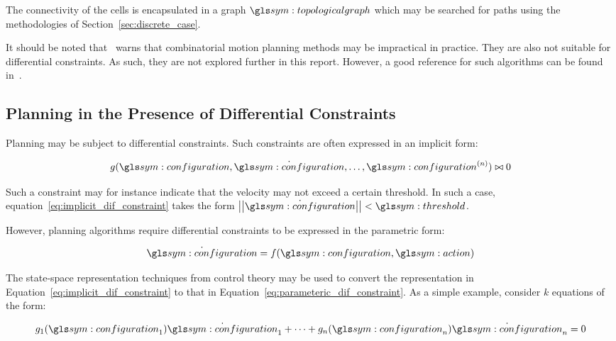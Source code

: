 			The connectivity of the cells is encapsulated in a graph
			$\topologicalgraph$ which may be searched for paths using the
			methodologies of Section~\ref{sec:discrete_case}.

			It should be noted that~\cite{bib:planning:planning_algorithms}
			warns that combinatorial motion planning methods may be impractical
			in practice. They are also not suitable for differential
			constraints.  As such, they are not explored further in this report.
			However, a good reference for such algorithms can be found
			in~\cite{bib:planning:robot_motion_planning}.


	\subsection{Planning in the Presence of Differential Constraints}%
	\label{sec:planning_in_the_presence_of_differential_constraints}

		Planning may be subject to differential constraints. Such constraints
		are often expressed in an implicit form:

		\begin{equation}
			g(\configuration, \dot{\configuration}, \ldots, \tdern{\configuration}{n})
				\relop 0
			\label{eq:implicit_dif_constraint}
		\end{equation}

		Such a constraint may for instance indicate that the velocity may not
		exceed a certain threshold. In such a case,
		equation~\ref{eq:implicit_dif_constraint} takes the form
		$\norm{\dot{\configuration}} < \threshold$.

		However, planning algorithms require differential constraints to be
		expressed in the parametric form:

		\begin{equation}
			\dot{\configuration} = f(\configuration, \action)
			\label{eq:parameteric_dif_constraint}
		\end{equation}

		The state-space representation techniques from control theory may be
		used to convert the representation in
		Equation~\ref{eq:implicit_dif_constraint} to that in
		Equation~\ref{eq:parameteric_dif_constraint}. As a simple example,
		consider $k$ equations of the form:

		\begin{equation}
			g_1(\configuration_1)\dot{\configuration}_1 + \cdots +
				g_n(\configuration_n)\dot{\configuration}_n
			=
			0
		\end{equation}

